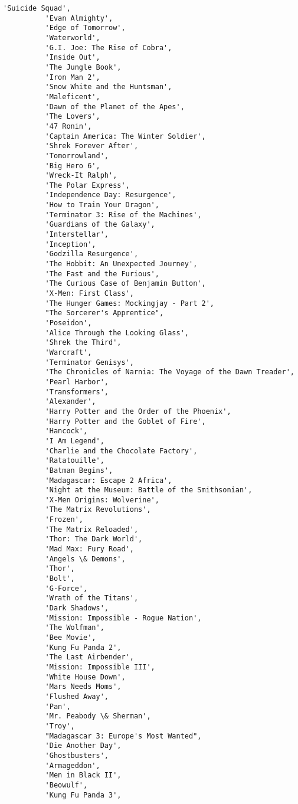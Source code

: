 \documentclass[11pt]{article}
\begin{document}
\begin{Verbatim}[commandchars=\\\{\}]
          'Suicide Squad',
          'Evan Almighty',
          'Edge of Tomorrow',
          'Waterworld',
          'G.I. Joe: The Rise of Cobra',
          'Inside Out',
          'The Jungle Book',
          'Iron Man 2',
          'Snow White and the Huntsman',
          'Maleficent',
          'Dawn of the Planet of the Apes',
          'The Lovers',
          '47 Ronin',
          'Captain America: The Winter Soldier',
          'Shrek Forever After',
          'Tomorrowland',
          'Big Hero 6',
          'Wreck-It Ralph',
          'The Polar Express',
          'Independence Day: Resurgence',
          'How to Train Your Dragon',
          'Terminator 3: Rise of the Machines',
          'Guardians of the Galaxy',
          'Interstellar',
          'Inception',
          'Godzilla Resurgence',
          'The Hobbit: An Unexpected Journey',
          'The Fast and the Furious',
          'The Curious Case of Benjamin Button',
          'X-Men: First Class',
          'The Hunger Games: Mockingjay - Part 2',
          "The Sorcerer's Apprentice",
          'Poseidon',
          'Alice Through the Looking Glass',
          'Shrek the Third',
          'Warcraft',
          'Terminator Genisys',
          'The Chronicles of Narnia: The Voyage of the Dawn Treader',
          'Pearl Harbor',
          'Transformers',
          'Alexander',
          'Harry Potter and the Order of the Phoenix',
          'Harry Potter and the Goblet of Fire',
          'Hancock',
          'I Am Legend',
          'Charlie and the Chocolate Factory',
          'Ratatouille',
          'Batman Begins',
          'Madagascar: Escape 2 Africa',
          'Night at the Museum: Battle of the Smithsonian',
          'X-Men Origins: Wolverine',
          'The Matrix Revolutions',
          'Frozen',
          'The Matrix Reloaded',
          'Thor: The Dark World',
          'Mad Max: Fury Road',
          'Angels \& Demons',
          'Thor',
          'Bolt',
          'G-Force',
          'Wrath of the Titans',
          'Dark Shadows',
          'Mission: Impossible - Rogue Nation',
          'The Wolfman',
          'Bee Movie',
          'Kung Fu Panda 2',
          'The Last Airbender',
          'Mission: Impossible III',
          'White House Down',
          'Mars Needs Moms',
          'Flushed Away',
          'Pan',
          'Mr. Peabody \& Sherman',
          'Troy',
          "Madagascar 3: Europe's Most Wanted",
          'Die Another Day',
          'Ghostbusters',
          'Armageddon',
          'Men in Black II',
          'Beowulf',
          'Kung Fu Panda 3',

\end{Verbatim}
\end{document}
